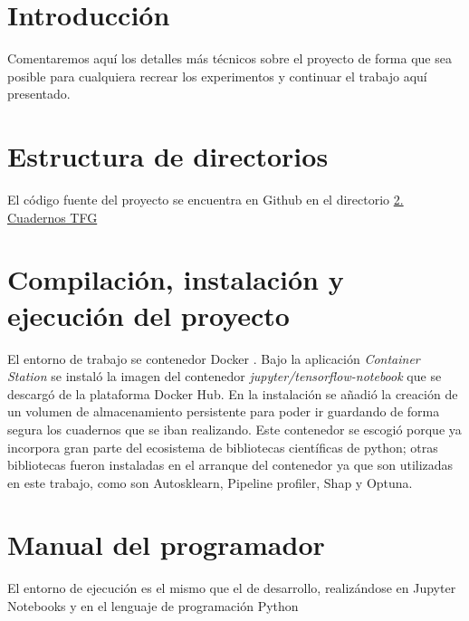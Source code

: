 
\section{Introducción}

Comentaremos aquí los detalles más técnicos sobre el proyecto de forma que sea posible para cualquiera recrear los experimentos y continuar el trabajo aquí presentado.

\section{Estructura de directorios}

El código fuente del proyecto se encuentra en Github en el directorio \href{https://github.com/sgg0008/ml-COVID-19/tree/main/2. Cuadernos TFG}{2. Cuadernos TFG}

\section{Compilación, instalación y ejecución del proyecto}

El entorno de trabajo se  contenedor Docker \cite{docker:2013}. Bajo la aplicación \textit{Container Station} se instaló la imagen del contenedor \textit{jupyter/tensorflow-notebook} \cite{jupyterdocker:1991} que se descargó de la plataforma Docker Hub. En la instalación se añadió la creación de un volumen de almacenamiento persistente para poder ir guardando de forma segura los cuadernos que se iban realizando. Este contenedor se escogió porque ya incorpora gran parte del ecosistema de bibliotecas científicas de python; otras bibliotecas fueron instaladas en el arranque del contenedor ya que son utilizadas en este trabajo, como son Autosklearn, Pipeline profiler, Shap y Optuna.

\section{Manual del programador}

El entorno de ejecución es el mismo que el de desarrollo, realizándose en Jupyter Notebooks \cite{jupyter:2014} y en el lenguaje de programación Python \cite{python:1991}